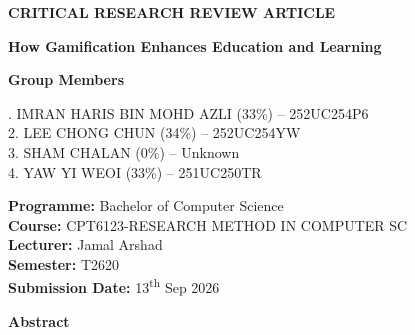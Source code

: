 \documentclass[12pt,a4paper]{article}
\begin{document}
\begin{center}

{\fontsize{18}{22}\selectfont\textbf{CRITICAL RESEARCH REVIEW ARTICLE}}

\vspace{0.5cm}

{\fontsize{18}{22}\selectfont\textbf{How Gamification Enhances Education and Learning}}

\vspace{1cm}

{\fontsize{12}{14}\selectfont\textbf{Group Members}}

\vspace{0.3cm}

{\fontsize{12}{14}. IMRAN HARIS BIN MOHD AZLI (33\%) -- 252UC254P6\\
2. LEE CHONG CHUN (34\%) -- 252UC254YW\\
3. SHAM CHALAN (0\%) -- Unknown\\ %
4. YAW YI WEOI (33\%) -- 251UC250TR
}

\vspace{0.8cm}

{\fontsize{12}{14}\selectfont
\textbf{Programme:} Bachelor of Computer Science\\
\textbf{Course:} CPT6123-RESEARCH METHOD IN COMPUTER SC\\
\textbf{Lecturer:} Jamal Arshad\\
\textbf{Semester:} T2620\\
\textbf{Submission Date:} 13\textsuperscript{th} Sep 2026
}

\end{center}



\vspace{0.5cm}

\noindent
\textbf{Abstract}

\vspace{0.2cm}
\end{document}
